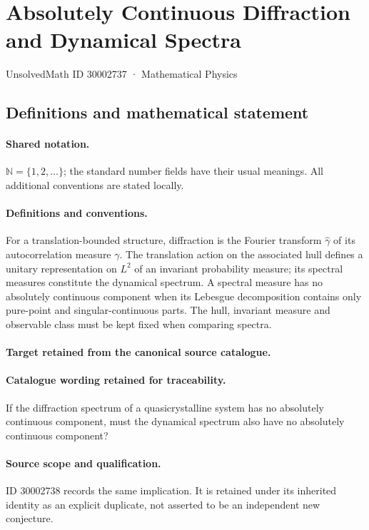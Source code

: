 \documentclass[11pt]{article}
\begin{document}
\setcounter{section}{30002736}
\section{Absolutely Continuous Diffraction and Dynamical Spectra}\label{30002737}
{\small UnsolvedMath ID 30002737 · Mathematical Physics}
\subsection{Definitions and mathematical statement}

\paragraph{Shared notation.}$\mathbb N=\{1,2,\ldots\}$; the standard number fields have their usual meanings. All additional conventions are stated locally.


\paragraph{Definitions and conventions.}
For a translation-bounded structure, diffraction is the Fourier transform $\widehat\gamma$ of its autocorrelation measure $\gamma$. The translation action on the associated hull defines a unitary representation on $L^2$ of an invariant probability measure; its spectral measures constitute the dynamical spectrum. A spectral measure has no absolutely continuous component when its Lebesgue decomposition contains only pure-point and singular-continuous parts. The hull, invariant measure and observable class must be kept fixed when comparing spectra.

\paragraph{Target retained from the canonical source catalogue.}
\paragraph{Catalogue wording retained for traceability.}
If the diffraction spectrum of a quasicrystalline system has no absolutely continuous component, must the dynamical spectrum also have no absolutely continuous component?

\paragraph{Source scope and qualification.}
ID 30002738 records the same implication. It is retained under its inherited identity as an explicit duplicate, not asserted to be an independent new conjecture.
\end{document}
